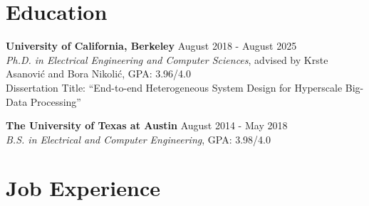 \documentclass[line]{res}
\begin{document}
\address{\href{https://abejgonzalez.github.io}{https://abejgonzalez.github.io} $|$ \href{mailto:abe.gonzalez@berkeley.edu}{abe.gonzalez@berkeley.edu}}

\begin{resume}

\vspace{-6mm}

\section{\Large{Education}}
\label{sec:education}
\vspace{2mm}

\textbf{University of California, Berkeley} \hfill August 2018 - August 2025
\\
\textit{Ph.D. in Electrical Engineering and Computer Sciences}, advised by Krste Asanovi\'c and Bora Nikoli\'c, GPA: 3.96/4.0
\\
Dissertation Title: ``End-to-end Heterogeneous System Design for Hyperscale Big-Data Processing''

\vspace{-2mm}

\textbf{The University of Texas at Austin} \hfill August 2014 - May 2018
\\
\textit{B.S. in Electrical and Computer Engineering}, GPA: 3.98/4.0

\section{\Large{Job Experience}}
\label{sec:jobs}
\vspace{2mm}


\end{resume}
\end{document}
